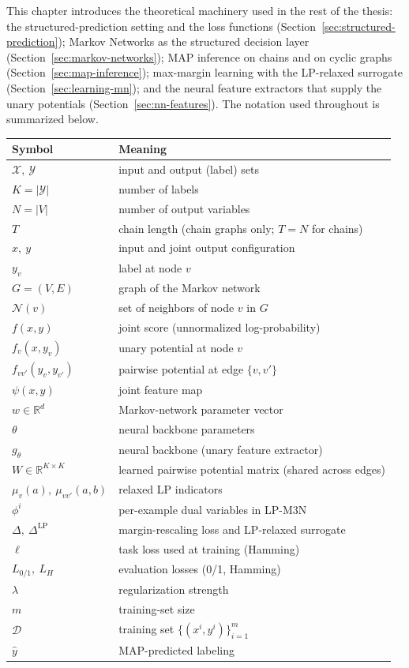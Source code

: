 This chapter introduces the theoretical machinery used in the rest
of the thesis: the structured-prediction setting and the loss
functions (Section~\ref{sec:structured-prediction}); Markov Networks as the
structured decision layer (Section~\ref{sec:markov-networks}); MAP
inference on chains and on cyclic graphs
(Section~\ref{sec:map-inference}); max-margin learning with the
LP-relaxed surrogate (Section~\ref{sec:learning-mn}); and the neural
feature extractors that supply the unary potentials
(Section~\ref{sec:nn-features}). The notation used throughout is
summarized below.

\begin{center}
\renewcommand{\arraystretch}{1.15}
\begin{tabular}{l l}
\hline
\textbf{Symbol} & \textbf{Meaning} \\
\hline
$\mathcal{X},\ \mathcal{Y}$ & input and output (label) sets \\
$K = |\mathcal{Y}|$ & number of labels \\
$N = |V|$ & number of output variables \\
$T$ & chain length (chain graphs only; $T = N$ for chains) \\
$x,\ y$ & input and joint output configuration \\
$y_v$ & label at node $v$ \\
$G = (V, E)$ & graph of the Markov network \\
$\mathcal{N}(v)$ & set of neighbors of node $v$ in $G$ \\
$f(x, y)$ & joint score (unnormalized log-probability) \\
$f_v(x, y_v)$ & unary potential at node $v$ \\
$f_{vv'}(y_v, y_{v'})$ & pairwise potential at edge $\{v, v'\}$ \\
$\psi(x, y)$ & joint feature map \\
$w \in \mathbb{R}^d$ & Markov-network parameter vector \\
$\theta$ & neural backbone parameters \\
$g_\theta$ & neural backbone (unary feature extractor) \\
$W \in \mathbb{R}^{K \times K}$ & learned pairwise potential matrix (shared across edges) \\
$\mu_v(a),\ \mu_{vv'}(a, b)$ & relaxed LP indicators \\
$\phi^{i}$ & per-example dual variables in LP-M3N \\
$\Delta,\ \Delta^{\mathrm{LP}}$ & margin-rescaling loss and LP-relaxed surrogate \\
$\ell$ & task loss used at training (Hamming) \\
$L_{0/1},\ L_H$ & evaluation losses (0/1, Hamming) \\
$\lambda$ & regularization strength \\
$m$ & training-set size \\
$\mathcal{D}$ & training set $\{(x^i, y^i)\}_{i=1}^{m}$ \\
$\hat{y}$ & MAP-predicted labeling \\
\hline
\end{tabular}
\end{center}

